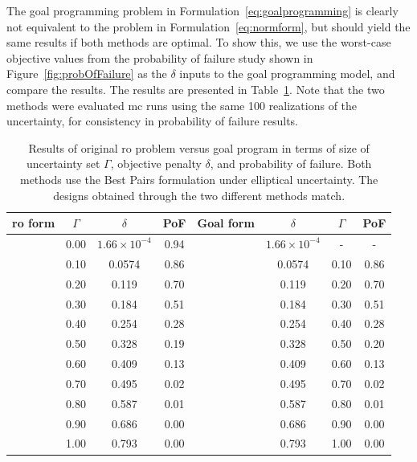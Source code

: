 The goal programming problem in Formulation~\ref{eq:goalprogramming} is clearly
not equivalent to the problem in Formulation~\ref{eq:normform},
but should yield the same results if both methods are optimal.
To show this, we use the worst-case objective values from the probability of failure study
shown in Figure~\ref{fig:probOfFailure} as the $\delta$ inputs to the goal programming model, and compare the results.
The results are presented in
Table~\ref{tab:deltaVsGamma}. Note that the two methods were evaluated \gls{mc} runs using the same 100 realizations
of the uncertainty, for consistency in probability of failure results.

\begin{table}
\begin{center}
\caption{\label{tab:deltaVsGamma} Results of original \gls{ro} problem versus goal program in terms
of size of uncertainty set $\Gamma$, objective penalty $\delta$, and probability of failure. Both methods
use the Best Pairs formulation under elliptical uncertainty. The designs obtained through
the two different methods match.}
\begin{tabular}{c c c c c c c c}
\hline
 \gls{ro} form & $\Gamma$ & $\delta$ & PoF & Goal form & $\delta$ & $\Gamma$ & PoF\\
\hline
& 0.00 & $1.66 \times 10^{-4}$ & 0.94 & & $1.66 \times 10^{-4}$ & - & - \\
& 0.10 & 0.0574 & 0.86 & & 0.0574 & 0.10 & 0.86 \\
& 0.20 & 0.119 & 0.70 & & 0.119 & 0.20 & 0.70 \\
& 0.30 & 0.184 & 0.51 & & 0.184 & 0.30 & 0.51 \\
& 0.40 & 0.254 & 0.28 & & 0.254 & 0.40 & 0.28 \\
& 0.50 & 0.328 & 0.19 & & 0.328 & 0.50 & 0.20 \\
& 0.60 & 0.409 & 0.13 & & 0.409 & 0.60 & 0.13 \\
& 0.70 & 0.495 & 0.02 & & 0.495 & 0.70 & 0.02 \\
& 0.80 & 0.587 & 0.01 & & 0.587 & 0.80 & 0.01 \\
& 0.90 & 0.686 & 0.00 & & 0.686 & 0.90 & 0.00 \\
& 1.00 & 0.793 & 0.00 & & 0.793 & 1.00 & 0.00 \\
\end{tabular}
\end{center}
\end{table}

